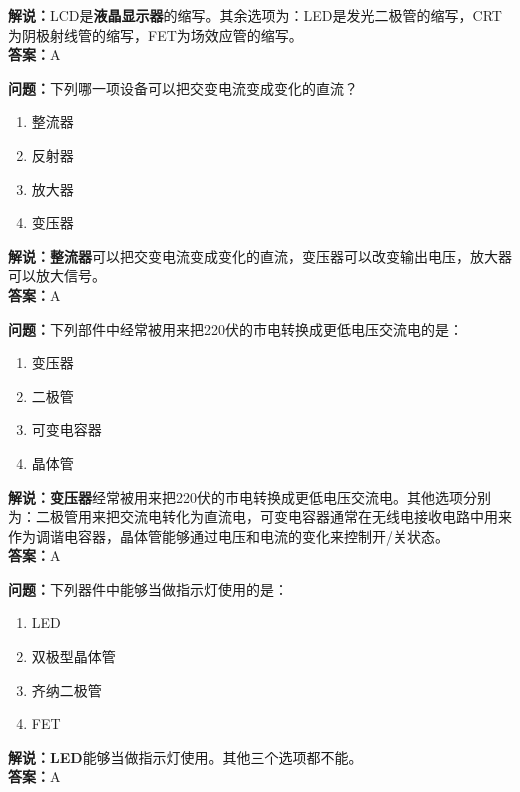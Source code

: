 \documentclass{ctexbook}
\begin{document}
\noindent\textbf{解说：}LCD是\textbf{液晶显示器}的缩写。其余选项为：LED是发光二极管的缩写，CRT为阴极射线管的缩写，FET为场效应管的缩写。\\\noindent\textbf{答案：}A

\bigskip


\noindent\textbf{问题：}下列哪一项设备可以把交变电流变成变化的直流？

\begin{enumerate}[label=\Alph*), leftmargin=3em]
	\item 整流器
	\item 反射器
	\item 放大器
	\item 变压器
\end{enumerate}

\noindent\textbf{解说：整流器}可以把交变电流变成变化的直流，变压器可以改变输出电压，放大器可以放大信号。\\\noindent\textbf{答案：}A


\bigskip


\noindent\textbf{问题：}下列部件中经常被用来把220伏的市电转换成更低电压交流电的是：

\begin{enumerate}[label=\Alph*), leftmargin=3em]
	\item 变压器
	\item 二极管
	\item 可变电容器
	\item 晶体管
\end{enumerate}

\noindent\textbf{解说：变压器}经常被用来把220伏的市电转换成更低电压交流电。其他选项分别为：二极管用来把交流电转化为直流电，可变电容器通常在无线电接收电路中用来作为调谐电容器，晶体管能够通过电压和电流的变化来控制开/关状态。\\\noindent\textbf{答案：}A

\bigskip


\noindent\textbf{问题：}下列器件中能够当做指示灯使用的是：

\begin{enumerate}[label=\Alph*), leftmargin=3em]
	\item LED
	\item 双极型晶体管
	\item 齐纳二极管
	\item FET
\end{enumerate}

\noindent\textbf{解说：LED}能够当做指示灯使用。其他三个选项都不能。\\\noindent\textbf{答案：}A
\end{document}
